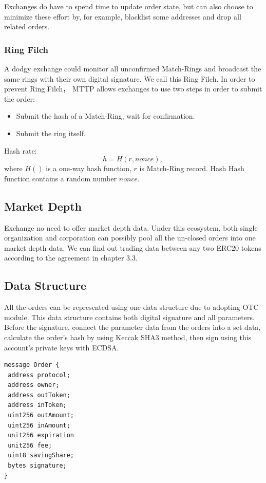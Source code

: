 \documentclass[UTF8,nofonts]{article}
\begin{document}
Exchanges do have to spend time to update order state, but can also choose to minimize these effort by, for example, blacklist some addresses and drop all related orders.

\subsubsection{Ring Filch}

A dodgy exchange could monitor all unconfirmed Match-Rings and broadcast the same rings with their own digital signature. We call this Ring Filch. In order to prevent Ring Filch， MTTP allows exchanges to use two steps in order to submit the order: 
\begin{itemize}
  \item Submit the hash of a Match-Ring, wait for confirmation.
  \item Submit the ring itself.
\end{itemize}
Hash rate:
$$h = H(r,  nonce)\text{, }$$
where $H()$ is a one-way hash function, $r$ is Match-Ring record. Hash Hash function contains a random number $nonce$.

\subsection{Market Depth\label{sec: marketdepth}}

Exchange no need to offer market depth data. Under this ecosystem,  both single organization and corporation can possibly pool all the un-closed orders into one market depth data. We can find out trading data between any two ERC20 tokens according to the agreement in chapter 3.3.

\subsection{Data Structure\label{sec: dataformat}}

All the orders can be represented using one data structure due to adopting OTC module. This  data structure contains both digital signature and all parameters. Before the signature,  connect the parameter data from the orders into a set data,  calculate the order's hash by using Keccak SHA3 method,  then sign using this account's private keys with ECDSA.


\begin{verbatim}
message Order {
 address protocol;
 address owner;
 address outToken;
 address inToken;
 uint256 outAmount;
 uint256 inAmount;
 unit256 expiration
 unit256 fee;
 uint8 savingShare;
 bytes signature;
}
\end{verbatim}
\end{document}
